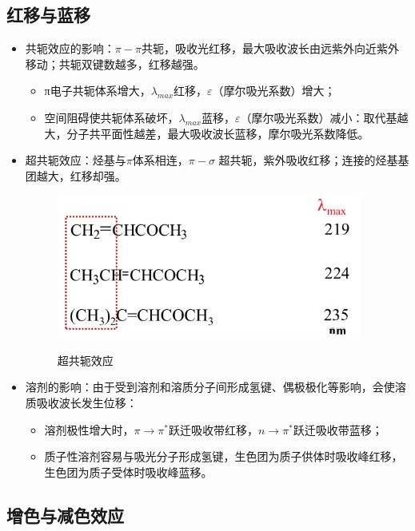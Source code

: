 \subsection{红移与蓝移}
\begin{itemize}
    \item 共轭效应的影响：$\pi -\pi$共轭，吸收光红移，最大吸收波长由远紫外向近紫外移动；共轭双键数越多，红移越强。
    \begin{itemize}
        \item  π电子共轭体系增大，$\lambda_{max}$红移，$\varepsilon$（摩尔吸光系数）增大；
        \item 空间阻碍使共轭体系破坏，$\lambda_{max}$蓝移，$\varepsilon$（摩尔吸光系数）减小：取代基越大，分子共平面性越差，最大吸收波长蓝移，摩尔吸光系数降低。
    \end{itemize}
    \item 超共轭效应：烃基与$\pi$体系相连，$\pi-\sigma$ 超共轭，紫外吸收红移；连接的烃基基团越大，红移却强。
    \begin{figure}[h]
        \centering
        \includegraphics[width=10cm]{image/chp3_ultra.png}
        \label{fig:chp3ultra}
        \caption{超共轭效应}
    \end{figure}
    \item 溶剂的影响：由于受到溶剂和溶质分子间形成氢键、偶极极化等影响，会使溶质吸收波长发生位移：
    \begin{itemize}
        \item 溶剂极性增大时，$\pi \rightarrow \pi^{*}$跃迁吸收带红移，$n\rightarrow \pi^{*}$跃迁吸收带蓝移；
        \item 质子性溶剂容易与吸光分子形成氢键，生色团为质子供体时吸收峰红移，生色团为质子受体时吸收峰蓝移。
    \end{itemize}
\end{itemize}

\subsection{增色与减色效应}

